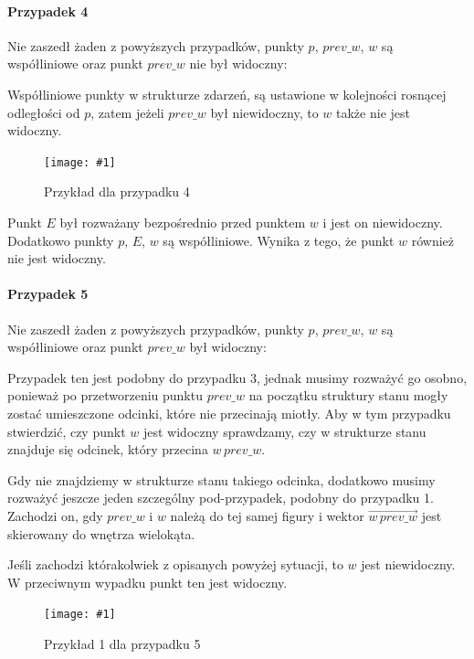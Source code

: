 \documentclass[12pt]{article}
\newcommand{\imgcustomsize}[3]{
	\begin{figure}[H]
		\centering
		\texttt{[image: \#1]}
		\caption{#2}
		\label{#1}
	\end{figure}
}
\newcommand{\img}[2]{\imgcustomsize{#1}{#2}{0.5}}
\begin{document}
			\paragraph{Przypadek 4}
			Nie zaszedł żaden z powyższych przypadków, punkty $ p $, $ prev\_w $, $ w $ są współliniowe oraz punkt $ prev\_w $ nie był widoczny:
			
			\vspace{\baselineskip} %
			Współliniowe punkty w strukturze zdarzeń, są ustawione w kolejności rosnącej odległości od $ p $, zatem jeżeli $ prev\_w $ był niewidoczny, to $ w $ także nie jest widoczny.
			
			\img{przypadek4.jpg}{Przykład dla przypadku 4}
			
			Punkt $ E $ był rozważany bezpośrednio przed punktem $ w $ i jest on niewidoczny. Dodatkowo punkty $ p $, $ E $, $ w $ są współliniowe. Wynika z tego, że punkt $ w $ również nie jest widoczny.
			
			\paragraph{Przypadek 5}
			Nie zaszedł żaden z powyższych przypadków, punkty $ p $, $ prev\_w $, $ w $ są współliniowe oraz punkt $ prev\_w $ był widoczny:
			
			\vspace{\baselineskip} %
			Przypadek ten jest podobny do przypadku 3, jednak musimy rozważyć go osobno, ponieważ po przetworzeniu punktu $ prev\_w $ na początku struktury stanu mogły zostać umieszczone odcinki, które nie przecinają miotły. Aby w tym przypadku stwierdzić, czy punkt $ w $ jest widoczny sprawdzamy, czy w strukturze stanu znajduje się odcinek, który przecina $ w\,prev\_w $. 
			
			\vspace{\baselineskip} %
			Gdy nie znajdziemy w strukturze stanu takiego odcinka, dodatkowo musimy rozważyć jeszcze jeden szczególny pod-przypadek, podobny do przypadku 1. Zachodzi on, gdy $ prev\_w $ i $ w $ należą do tej samej figury i wektor $ \overrightarrow{w\,prev\_w} $ jest skierowany do wnętrza wielokąta.
			
			\vspace{\baselineskip} %
			Jeśli zachodzi którakolwiek z opisanych powyżej sytuacji, to $ w $ jest niewidoczny. W przeciwnym wypadku punkt ten jest widoczny.
			
			
			\img{przypadek5.1.jpg}{Przykład 1 dla przypadku 5}
			
\end{document}
